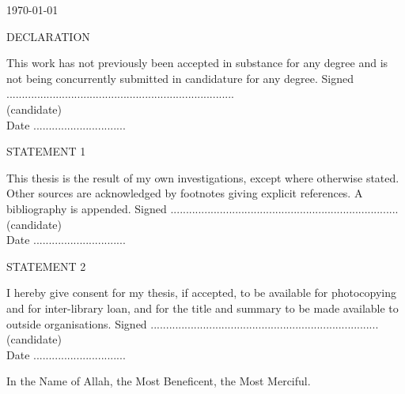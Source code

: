 \begin{titlepage}
\begin{center}
\noindent
\today
\end{center}
%
\newpage
\begin{Large}
\noindent
DECLARATION\\
\end{Large}
\newline	
This work has not previously been accepted in substance for any degree and is not being concurrently submitted in candidature for any degree.	
\newline
\newline
Signed ..........................................................................\\
(candidate)	\\
\newline
Date ..............................\\
\newline
\newline
\begin{large}
\noindent
STATEMENT 1\\
\end{large}
\newline
This thesis is the result of my own investigations, except where otherwise stated. Other sources are acknowledged by footnotes giving explicit references.  A bibliography is appended.
\newline
\newline
Signed ..........................................................................\\
(candidate)	\\
\newline
Date ..............................\\
\newline
\newline
\begin{large}
\noindent
STATEMENT 2	\\
\end{large}
\newline
I hereby give consent for my thesis, if accepted, to be available for photocopying and for inter-library loan, and for the title and summary to be made available to outside organisations.	
\newline
\newline
Signed ..........................................................................\\
(candidate)	\\
\newline
Date ..............................\\
\newpage
\thispagestyle{empty}	
\begin{center}
\noindent
\large
In the Name of Allah, the Most Beneficent, the Most Merciful.
\end{center}
%

\end{titlepage}
